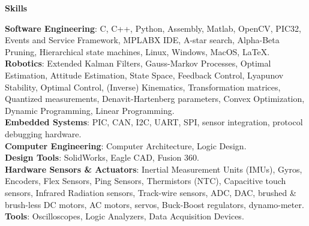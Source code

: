 \documentclass[paper=a4,fontsize=11pt]{article} %
\def \subSectionSpace   {0.3cm}     %
\def \leftColSpace      {0.12}      %
\def \bigMiddleColSpace {0.875}     %
\def \lineWidth         {18cm}      %
\def \lineThickness     {2pt}       %
\begin{document}
    \noindent
    \begin{minipage}[t]{\leftColSpace\linewidth}
    \noindent \textbf{Skills}\\
    \end{minipage}
    \begin{minipage}[t]{\bigMiddleColSpace\linewidth}
        \begin{flushleft}
            \noindent \textbf{Software Engineering}: C, C++, Python, Assembly, Matlab, OpenCV, PIC32, Events and Service Framework, MPLABX IDE, A-star search, Alpha-Beta Pruning, Hierarchical state machines, Linux, Windows, MacOS, \LaTeX.\\
            \vspace{\subSectionSpace}
            \noindent \textbf{Robotics}: Extended Kalman Filters, Gauss-Markov Processes, Optimal Estimation, Attitude Estimation, State Space, Feedback Control, Lyapunov Stability, Optimal Control, (Inverse) Kinematics, Transformation matrices, Quantized measurements, Denavit-Hartenberg parameters, Convex Optimization, Dynamic Programming, Linear Programming.\\
            \vspace{\subSectionSpace}
            \noindent \textbf{Embedded Systems}: PIC, CAN, I2C, UART, SPI, sensor integration, protocol debugging hardware.\\
            \vspace{\subSectionSpace}
            \noindent \textbf{Computer Engineering}: Computer Architecture, Logic Design.\\
            \vspace{\subSectionSpace}
            \noindent \textbf{Design Tools}: SolidWorks, Eagle CAD, Fusion 360.\\
            \vspace{\subSectionSpace}
            \noindent \textbf{Hardware Sensors \& Actuators}: Inertial Measurement Units (IMUs), Gyros, Encoders, Flex Sensors, Ping Sensors, Thermistors (NTC), Capacitive touch sensors, Infrared Radiation sensors, Track-wire sensors, ADC, DAC, brushed \& brush-less DC motors, AC motors, servos, Buck-Boost regulators, dynamo-meter.\\
            \vspace{\subSectionSpace}
            \noindent \textbf{Tools}: Oscilloscopes, Logic Analyzers, Data Acquisition Devices.\\
        \end{flushleft}
    \end{minipage}
\end{document}
